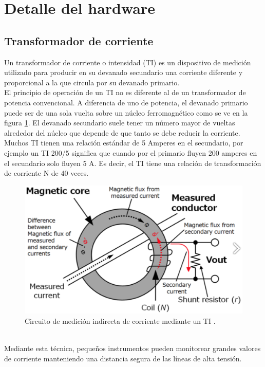 \section{Detalle del hardware}
\subsection{Transformador de corriente}
Un transformador de corriente o intensidad (TI) es un dispositivo de medición utilizado para producir en su devanado secundario una corriente diferente y proporcional a la que circula por su devanado primario.\\
El principio de operación de un TI no es diferente al de un transformador de potencia convencional. A diferencia de uno de potencia, el devanado primario puede ser de una sola vuelta sobre un núcleo ferromagnético como se ve en la figura \ref{fig:dibujomedicionti}. El devanado secundario suele tener un número mayor de vueltas alrededor del núcleo que depende de que tanto se debe reducir la corriente.\\
Muchos TI tienen una relación estándar de 5 Amperes en el secundario, por ejemplo un TI 200/5 significa que cuando por el primario fluyen 200 amperes en el secundario solo fluyen 5 A. Es decir, el TI tiene una relación de transformación de corriente N de 40 veces.\\
\begin{figure}[h!]
	\centering
	\includegraphics[width=0.8\linewidth]{Figures/dibujo_medicion_TI}
	\caption{Circuito de medición indirecta de corriente mediante un TI \citep{hioki}.}
	\label{fig:dibujomedicionti}
\end{figure}\\
Mediante esta técnica, pequeños instrumentos pueden monitorear grandes valores de corriente manteniendo una distancia segura de las líneas de alta tensión.

